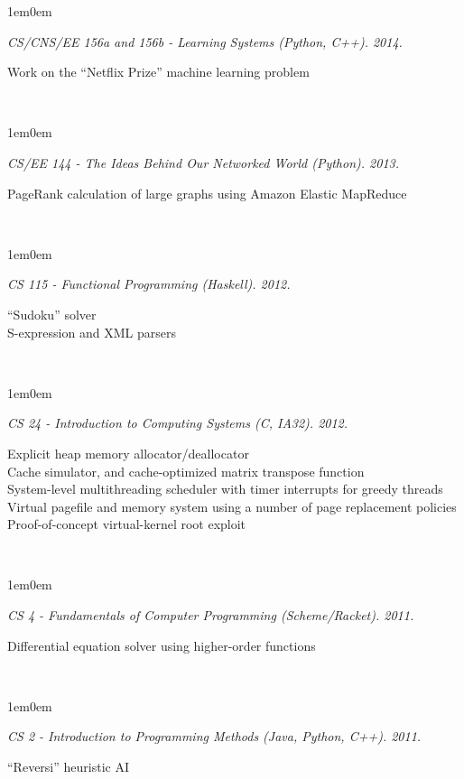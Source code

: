 \documentclass[10pt,letterpaper, full]{article}
\newcommand{\pjtitle}[1]{\renewcommand{\givenpjtitle}{#1}}
\newcommand{\pjtime}[1]{\renewcommand{\givenpjtime}{#1}}
\newcommand{\pjbody}[1]{\renewcommand{\givenpjbody}{#1}}
\newcommand{\givenpjtitle}{REQUIRED!}
\newcommand{\givenpjtime}{REQUIRED!}
\newcommand{\givenpjbody}{REQUIRED!}
\newenvironment{projectenv}
    {
        \begin{adjustwidth}{1em}{0em}
    }
    {
        \textit{\givenpjtitle. \givenpjtime.}

        \begin{minipage}[l]{\textwidth}
            \givenpjbody%
        \end{minipage}\\%


        \end{adjustwidth}
    }
\begin{document}
\begin{projectenv}%
    \pjtitle{CS/CNS/EE 156a and 156b - Learning Systems (Python, C++)}
    \pjtime{2014}
    \pjbody{
        Work on the “Netflix Prize” machine learning problem
    }
\end{projectenv}%

\begin{projectenv}%
    \pjtitle{CS/EE 144 - The Ideas Behind Our Networked World (Python)}
    \pjtime{2013}
    \pjbody{
        PageRank calculation of large graphs using Amazon Elastic MapReduce\\
    }
\end{projectenv}%

\begin{projectenv}%
    \pjtitle{CS 115 - Functional Programming (Haskell)}
    \pjtime{2012}
    \pjbody{
        “Sudoku” solver\\
        S-expression and XML parsers\\
    }
\end{projectenv}%

\begin{projectenv}%
    \pjtitle{CS 24 - Introduction to Computing Systems (C, IA32)}
    \pjtime{2012}
    \pjbody{
    Explicit heap memory allocator/deallocator\\
    Cache simulator, and cache-optimized matrix transpose function\\
    System-level multithreading scheduler with timer interrupts for greedy threads\\
    Virtual pagefile and memory system using a number of page replacement policies\\
    Proof-of-concept virtual-kernel root exploit\\
    }
\end{projectenv}%

\begin{projectenv}%
    \pjtitle{CS 4 - Fundamentals of Computer Programming (Scheme/Racket)}
    \pjtime{2011}
    \pjbody{
        Differential equation solver using higher-order functions
    }
\end{projectenv}%

\begin{projectenv}%
    \pjtitle{CS 2 - Introduction to Programming Methods (Java, Python, C++)}
    \pjtime{2011}
    \pjbody{
        “Reversi” heuristic AI
    }
\end{projectenv}%
\end{document}
